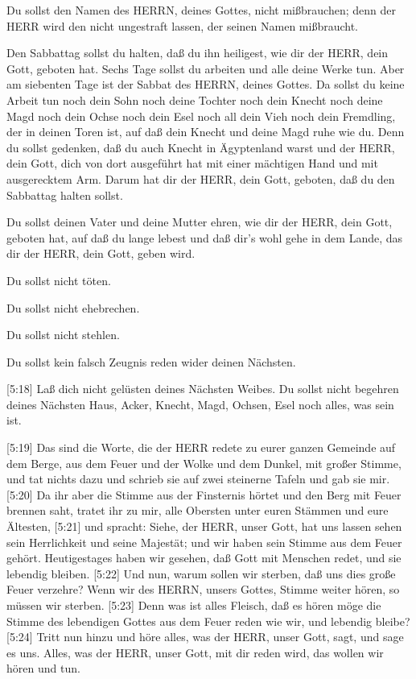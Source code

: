  Du sollst den Namen des HERRN, deines Gottes, nicht
mißbrauchen; denn der HERR wird den nicht ungestraft lassen, der seinen
Namen mißbraucht.

 Den Sabbattag sollst du halten, daß du ihn heiligest, wie
dir der HERR, dein Gott, geboten hat.  Sechs Tage sollst du
arbeiten und alle deine Werke tun.  Aber am siebenten Tage
ist der Sabbat des HERRN, deines Gottes. Da sollst du keine Arbeit tun
noch dein Sohn noch deine Tochter noch dein Knecht noch deine Magd noch
dein Ochse noch dein Esel noch all dein Vieh noch dein Fremdling, der in
deinen Toren ist, auf daß dein Knecht und deine Magd ruhe wie du.
 Denn du sollst gedenken, daß du auch Knecht in Ägyptenland
warst und der HERR, dein Gott, dich von dort ausgeführt hat mit einer
mächtigen Hand und mit ausgerecktem Arm. Darum hat dir der HERR, dein
Gott, geboten, daß du den Sabbattag halten sollst.

 Du sollst deinen Vater und deine Mutter ehren, wie dir der
HERR, dein Gott, geboten hat, auf daß du lange lebest und daß dir's wohl
gehe in dem Lande, das dir der HERR, dein Gott, geben wird.

 Du sollst nicht töten.

 Du sollst nicht ehebrechen.

 Du sollst nicht stehlen.

 Du sollst kein falsch Zeugnis reden wider deinen Nächsten.

 {[}5:18{]} Laß dich nicht gelüsten deines Nächsten Weibes.
Du sollst nicht begehren deines Nächsten Haus, Acker, Knecht, Magd,
Ochsen, Esel noch alles, was sein ist.

 {[}5:19{]} Das sind die Worte, die der HERR redete zu
eurer ganzen Gemeinde auf dem Berge, aus dem Feuer und der Wolke und dem
Dunkel, mit großer Stimme, und tat nichts dazu und schrieb sie auf zwei
steinerne Tafeln und gab sie mir.  {[}5:20{]} Da ihr aber
die Stimme aus der Finsternis hörtet und den Berg mit Feuer brennen
saht, tratet ihr zu mir, alle Obersten unter euren Stämmen und eure
Ältesten,  {[}5:21{]} und spracht: Siehe, der HERR, unser
Gott, hat uns lassen sehen sein Herrlichkeit und seine Majestät; und wir
haben sein Stimme aus dem Feuer gehört. Heutigestages haben wir gesehen,
daß Gott mit Menschen redet, und sie lebendig bleiben. 
{[}5:22{]} Und nun, warum sollen wir sterben, daß uns dies große Feuer
verzehre? Wenn wir des HERRN, unsers Gottes, Stimme weiter hören, so
müssen wir sterben.  {[}5:23{]} Denn was ist alles Fleisch,
daß es hören möge die Stimme des lebendigen Gottes aus dem Feuer reden
wie wir, und lebendig bleibe?  {[}5:24{]} Tritt nun hinzu
und höre alles, was der HERR, unser Gott, sagt, und sage es uns. Alles,
was der HERR, unser Gott, mit dir reden wird, das wollen wir hören und
tun.

